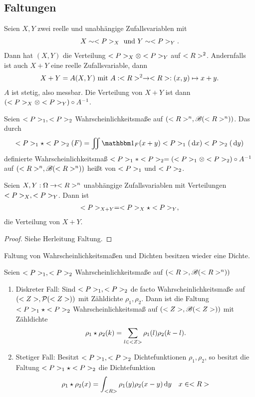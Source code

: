 \subsection*{Faltungen}
Seien $X, Y$ zwei reelle und unabhängige Zufallsvariablen mit 
\begin{align*}
	X \sim \P_X \und Y \sim \P_Y.
\end{align*}
Dann hat $(X,Y)$ die Verteilung $\P_X \otimes \P_Y$ auf $\R^2$. Andernfalls ist auch $X+Y$ eine reelle Zufallsvariable, dann
\begin{align*}
	X + Y = A(X,Y) \mit A: \R^2 \to \R: (x,y) \mapsto x + y.
\end{align*}
$A$ ist stetig, also messbar. Die Verteilung von $X+Y$ ist dann $(\P_X \otimes \P_Y)\circ A^{-1}$.
\begin{definition}[Faltung]
	Seien $\P_1 , \P_2$ Wahrscheinlichkeitsmaße auf $(\Rn, \borel(\Rn))$. Das durch
	\begin{align*}
		\P_1 \star \P_2(F) = \iint \indi_F (x+y) \P_1 (\d x)\P_2 (\d y)
	\end{align*}
	definierte Wahrscheinlichkeitsmaß $\P_1 \ast \P_2 = (\P_1 \otimes \P_2) \circ A^{-1}$ auf $(\Rn, \borel(\Rn))$ heißt  von $\P_1$ und $\P_2$.
\end{definition}
\begin{proposition}
	Seien $X,Y: \O \to \Rn$ unabhängige Zufallsvariablen mit Verteilungen $\P_X, \P_Y$. Dann ist
	\begin{align*}
		\P_{X+Y} = \P_X \star \P_Y,
	\end{align*}
	die Verteilung von $X +  Y$.
\end{proposition}
\begin{proof}
	Siehe Herleitung Faltung.
\end{proof}
Faltung von Wahrscheinlichkeitsmaßen und Dichten besitzen wieder eine Dichte.
\begin{proposition}
	Seien $\P_1 , \P_2$ Wahrscheinlichkeitsmaße auf $(\R, \borel(\Rn))$
	\begin{enumerate}
		\item Diskreter Fall: Sind $\P_1 , \P_2$ de facto Wahrscheinlichkeitsmaße auf $(\Z, \pows(\Z))$ mit Zähldichte $\rho_1 , \rho_2$. Dann ist die Faltung $\P_1 \star \P_2$ Wahrscheinlichkeitsmaß auf $(\Z, \borel(\Z))$ mit Zähldichte
		\begin{align*}
			\rho_1 \star \rho_2 (k) = \sum_{l \in \Z} \rho_1 (l) \rho_2 (k-l).
		\end{align*}
		\item Stetiger Fall: Besitzt $\P_1 , \P_2$ Dichtefunktionen $\rho_1, \rho_2$, so besitzt die Faltung $\P_1 \star \P_2$ die Dichtefunktion
		\begin{align*}
			\rho_1 \star \rho_2 (x) = \int_{\R} \rho_1 (y) \rho_2 (x-y) \d y \quad x \in \R
		\end{align*}
	\end{enumerate}
\end{proposition}
